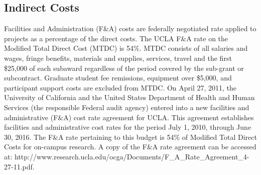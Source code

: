 \documentclass[11pt]{article}
\begin{document}
\subsection*{Indirect Costs}

Facilities and Administration (F\&A) costs are federally negotiated
rate applied to projects as a percentage of the direct costs.  The
UCLA F\&A rate on the Modified Total Direct Cost (MTDC) is 54\%.  MTDC
consists of all salaries and wages, fringe benefits, materials and
supplies, services, travel and the first \$25,000 of each subaward
regardless of the period covered by the sub-grant or subcontract.
Graduate student fee remissions, equipment over \$5,000, and
participant support costs are excluded from MTDC.  On April 27, 2011,
the University of California and the United States Department of
Health and Human Services (the responsible Federal audit agency)
entered into a new facilities and administrative (F\&A) cost rate
agreement for UCLA. This agreement establishes facilities and
administrative cost rates for the period July 1, 2010, through June
30, 2016.  The F\&A rate pertaining to this budget is 54\% of Modified
Total Direct Costs for on-campus research.  A copy of the F\&A rate
agreement can be accessed at: {\ttfamily
  http://www.research.ucla.edu/ocga/Documents/F\_A\_Rate\_Agreement\_4-27-11.pdf}.
\end{document}
